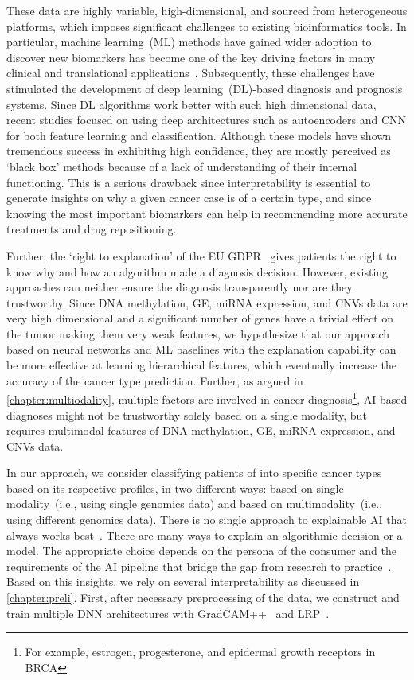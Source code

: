 \hspace*{3.5mm} These data are highly variable, high-dimensional, and sourced from heterogeneous platforms, which imposes significant challenges to existing bioinformatics tools. In particular, machine learning~(ML) methods have gained wider adoption to discover new biomarkers has become one of the key driving factors in many clinical and translational applications~\cite{mostavi2019convolutional}. Subsequently, these challenges have stimulated the development of deep learning~(DL)-based diagnosis and prognosis systems. Since DL algorithms work better with such high dimensional data, recent studies focused on using deep architectures such as autoencoders and CNN for both feature learning and classification. Although these models have shown tremendous success in exhibiting high confidence, they are mostly perceived as `black box' methods because of a lack of understanding of their internal functioning. This is a serious drawback since interpretability is essential to generate insights on why a given cancer case is of a certain type, and since knowing the most important biomarkers can help in recommending more accurate treatments and drug repositioning. 

\hspace*{3.5mm} Further, the `right to explanation' of the EU GDPR~\cite{kaminski2019right} gives patients the right to know why and how an algorithm made a diagnosis decision. However, existing approaches can neither ensure the diagnosis transparently nor are they trustworthy. Since DNA methylation, GE, miRNA expression, and CNVs data are very high dimensional and a significant number of genes have a trivial effect on the tumor making them very weak features, we hypothesize that our approach  based on neural networks and ML baselines with the explanation capability can be more effective at learning hierarchical features, which eventually increase the accuracy of the cancer type prediction. Further, as argued in \cref{chapter:multiodality}, multiple factors are involved in cancer diagnosis\footnote{For example, estrogen, progesterone, and epidermal growth receptors in BRCA}, AI-based diagnoses might not be trustworthy solely based on a single modality, but requires multimodal features of DNA methylation, GE, miRNA expression, and CNVs data. 

\hspace*{3.5mm} In our approach, we consider classifying patients of into specific cancer types based on its respective profiles, in two different ways: based on single modality~(i.e., using single genomics data) and based on multimodality~(i.e., using different genomics data). There is no single approach to explainable AI that always works best~\cite{arya2019one}. There are many ways to explain an algorithmic decision or a model. The appropriate choice depends on the persona of the consumer and the requirements of the AI pipeline that bridge the gap from research to practice~\cite{arya2019one}. Based on this insights, we rely on several interpretability as discussed in \cref{chapter:preli}. First, after necessary preprocessing of the data, we construct and train multiple DNN architectures with GradCAM++~\cite{chattopadhay2018grad} and LRP~\cite{LRP1}. 

